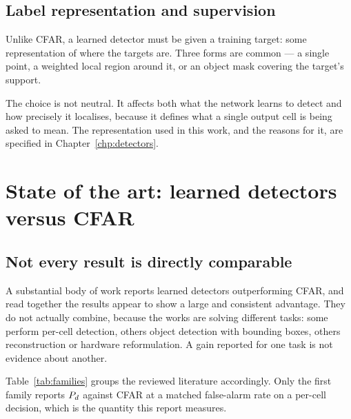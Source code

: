 \subsection{Label representation and supervision}

Unlike CFAR, a learned detector must be given a training target: some representation of where the
targets are. Three forms are common --- a single point, a weighted local region around it, or an
object mask covering the target's support.

The choice is not neutral. It affects both what the network learns to detect and how precisely it
localises, because it defines what a single output cell is being asked to mean. The representation
used in this work, and the reasons for it, are specified in Chapter~\ref{chp:detectors}.

\section{State of the art: learned detectors versus CFAR}
\label{sec:sota}

\subsection{Not every result is directly comparable}

A substantial body of work reports learned detectors outperforming CFAR, and read together the
results appear to show a large and consistent advantage. They do not actually combine, because the
works are solving different tasks: some perform per-cell detection, others object detection with
bounding boxes, others reconstruction or hardware reformulation. A gain reported for one task is
not evidence about another.

Table~\ref{tab:families} groups the reviewed literature accordingly. Only the first family reports
$P_{d}$ against CFAR at a matched false-alarm rate on a per-cell decision, which is the quantity this
report measures.

